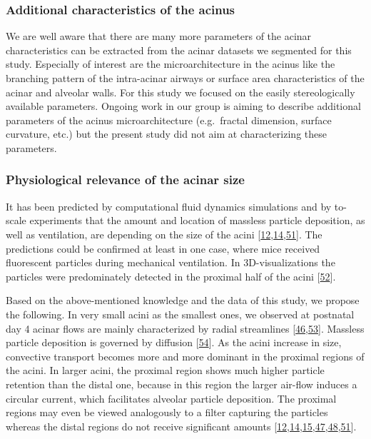 \documentclass[
  american,
]{article}
\begin{document}
\hypertarget{additional-characteristics-of-the-acinus}{%
\subsubsection{Additional characteristics of the acinus}\label{additional-characteristics-of-the-acinus}}

We are well aware that there are many more parameters of the acinar characteristics can be extracted from the acinar datasets we segmented for this study.
Especially of interest are the microarchitecture in the acinus like the branching pattern of the intra-acinar airways or surface area characteristics of the acinar and alveolar walls.
For this study we focused on the easily stereologically available parameters.
Ongoing work in our group is aiming to describe additional parameters of the acinus microarchitecture (e.g.~fractal dimension, surface curvature, etc.) but the present study did not aim at characterizing these parameters.

\hypertarget{physiological-relevance-of-the-acinar-size}{%
\subsubsection{Physiological relevance of the acinar size}\label{physiological-relevance-of-the-acinar-size}}

It has been predicted by computational fluid dynamics simulations and by to-scale experiments that the amount and location of massless particle deposition, as well as ventilation, are depending on the size of the acini {[}\protect\hyperlink{ref-CVl41LwO}{12},\protect\hyperlink{ref-1DP2FRUSZ}{14},\protect\hyperlink{ref-RJ9GQcwl}{51}{]}.
The predictions could be confirmed at least in one case, where mice received fluorescent particles during mechanical ventilation.
In 3D-visualizations the particles were predominately detected in the proximal half of the acini {[}\protect\hyperlink{ref-19jBv0ima}{52}{]}.

Based on the above-mentioned knowledge and the data of this study, we propose the following.
In very small acini as the smallest ones, we observed at postnatal day 4 acinar flows are mainly characterized by radial streamlines {[}\protect\hyperlink{ref-eioib1TQ}{46},\protect\hyperlink{ref-afF83siN}{53}{]}.
Massless particle deposition is governed by diffusion {[}\protect\hyperlink{ref-k5fqLjiy}{54}{]}.
As the acini increase in size, convective transport becomes more and more dominant in the proximal regions of the acini.
In larger acini, the proximal region shows much higher particle retention than the distal one, because in this region the larger air-flow induces a circular current, which facilitates alveolar particle deposition.
The proximal regions may even be viewed analogously to a filter capturing the particles whereas the distal regions do not receive significant amounts {[}\protect\hyperlink{ref-CVl41LwO}{12},\protect\hyperlink{ref-1DP2FRUSZ}{14},\protect\hyperlink{ref-yHHhvOtP}{15},\protect\hyperlink{ref-1HOyVjqpM}{47},\protect\hyperlink{ref-OT4s1CSX}{48},\protect\hyperlink{ref-RJ9GQcwl}{51}{]}.
\end{document}
